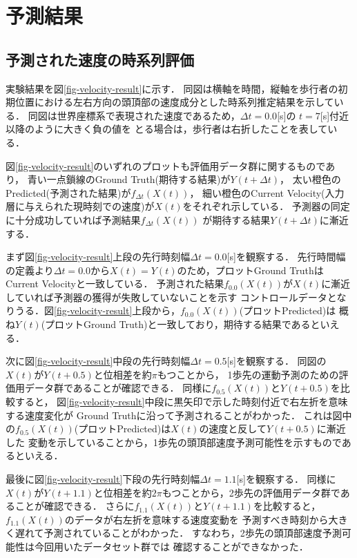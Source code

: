 \documentclass{sigchi}
\begin{document}

\section{予測結果}%

\subsection{予測された速度の時系列評価}

実験結果を図\ref{fig-velocity-result}に示す．
同図は横軸を時間，縦軸を歩行者の初期位置における左右方向の頭頂部の速度成分とした時系列推定結果を示している．
同図は世界座標系で表現された速度であるため，$\Delta t = 0.0$[s]の $t=7$[s]付近以降のように大きく負の値を
とる場合は，歩行者は右折したことを表している．

図\ref{fig-velocity-result}のいずれのプロットも評価用データ群に関するものであり，
青い一点鎖線のGround Truth(期待する結果)が$Y(t+\Delta t)$，
太い橙色のPredicted(予測された結果)が$f_{\Delta t}(X(t))$，
細い橙色のCurrent Velocity(入力層に与えられた現時刻での速度)が$X(t)$をそれぞれ示している．
予測器の同定に十分成功していれば予測結果$f_{\Delta t}(X(t))$ が期待する結果$Y(t + \Delta t)$に漸近する．

まず図\ref{fig-velocity-result}上段の先行時刻幅$\Delta t= 0.0$[s]を観察する．
先行時間幅の定義より$\Delta t= 0.0$から$X(t)=Y(t)$のため，プロットGround TruthはCurrent Velocityと一致している．
予測された結果$f_{0.0}(X(t))$が$X(t)$に漸近していれば予測器の獲得が失敗していないことを示す
コントロールデータとなりうる．図\ref{fig-velocity-result}上段から，$f_{0.0}(X(t))$(プロットPredicted)は
概ね$Y(t)$(プロットGround Truth)と一致しており，期待する結果であるといえる．

次に図\ref{fig-velocity-result}中段の先行時刻幅$\Delta t= 0.5$[s]を観察する．
同図の$X(t)$が$Y(t+0.5)$と位相差を約$\pi$もつことから，
1歩先の運動予測のための評価用データ群であることが確認できる．
同様に$f_{0.5}(X(t))$と$Y(t+0.5)$を比較すると，
図\ref{fig-velocity-result}中段に黒矢印で示した時刻付近で右左折を意味する速度変化が
Ground Truthに沿って予測されることがわかった．
これは図中の$f_{0.5}(X(t))$(プロットPredicted)は$X(t)$の速度と反して$Y(t+0.5)$に漸近した
変動を示していることから，1歩先の頭頂部速度予測可能性を示すものであるといえる．

最後に図\ref{fig-velocity-result}下段の先行時刻幅$\Delta t= 1.1$[s]を観察する．
同様に$X(t)$が$Y(t+1.1)$と位相差を約$2\pi$もつことから，2歩先の評価用データ群であることが確認できる．
さらに$f_{1.1}(X(t))$と$Y(t+1.1)$を比較すると，$f_{1.1}(X(t))$のデータが右左折を意味する速度変動を
予測すべき時刻から大きく遅れて予測されていることがわかった．
すなわち，2歩先の頭頂部速度予測可能性は今回用いたデータセット群では
確認することができなかった．
\end{document}
